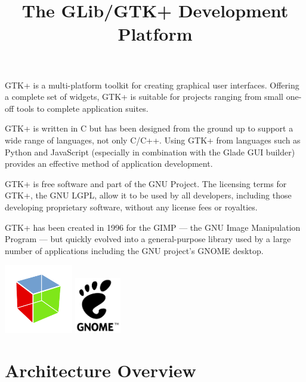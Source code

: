 \documentclass[a4paper,notumble]{leaflet}
\title{The GLib/GTK+ Development Platform}
\date{}
\author{}
\begin{document}
\maketitle
\thispagestyle{empty}

GTK+ is a multi-platform toolkit for creating graphical user interfaces. Offering a complete set of widgets, GTK+ is suitable for projects ranging from small one-off tools to complete application suites.

GTK+ is written in C but has been designed from the ground up to support a wide range of languages, not only C/C++. Using GTK+ from languages such as Python and JavaScript (especially in combination with the Glade GUI builder) provides an effective method of application development.

GTK+ is free software and part of the GNU Project. The licensing terms for GTK+, the GNU LGPL, allow it to be used by all developers, including those developing proprietary software, without any license fees or royalties.

GTK+ has been created in 1996 for the GIMP --- the GNU Image Manipulation Program --- but quickly evolved into a general-purpose library used by a large number of applications including the GNU project's GNOME desktop.

\begin{center}
  \includegraphics[width=3cm]{images/gtk-logo.pdf}
  \hspace{1cm}
  \includegraphics[width=2cm]{images/gnome-logo.pdf}
\end{center}

\pagebreak

\section{Architecture Overview}
\end{document}
